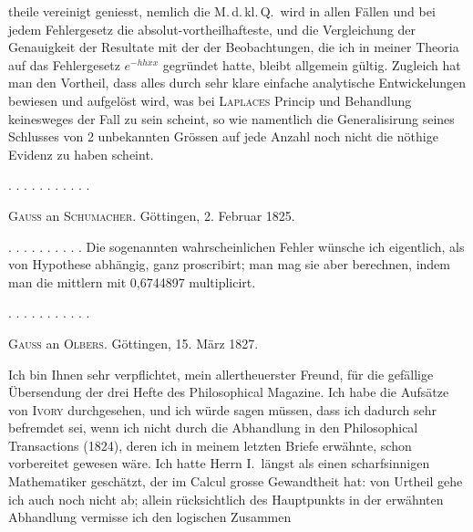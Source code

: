 theile vereinigt geniesst, nemlich die M.\,d.\,kl.\,Q.\ wird in allen Fällen und bei jedem Fehlergesetz die absolut-vortheilhafteste, und die Vergleichung der Genauigkeit der Resultate mit der der Beobachtungen, die ich in meiner Theoria auf das Fehlergesetz $e^{-hhxx}$ gegründet hatte, bleibt allgemein gültig. Zugleich hat man den Vortheil, dass alles durch sehr klare einfache analytische Entwickelungen bewiesen und aufgelöst wird, was bei \textsc{Laplaces} Princip und Behandlung keinesweges der Fall zu sein scheint, so wie namentlich die Generalisirung seines Schlusses von 2 unbekannten Grössen auf jede Anzahl noch nicht die nöthige Evidenz zu haben scheint.

\noindent . . . . . . . . . . .



\begin{center}
\textsc{Gauss} an \textsc{Schumacher}. Göttingen, 2. Februar 1825.
\end{center}

\noindent . . . . . . . . . . Die sogenannten wahrscheinlichen Fehler wünsche ich eigentlich, als von Hypothese abhängig, ganz proscribirt; man mag sie aber berechnen, indem man die mittlern mit 0,6744897 multiplicirt.

\noindent . . . . . . . . . . .



\begin{center}
\textsc{Gauss} an \textsc{Olbers}. Göttingen, 15. März 1827.
\end{center}

\noindent Ich bin Ihnen sehr verpflichtet, mein allertheuerster Freund, für die gefällige Übersendung der drei Hefte des Philosophical Magazine. Ich habe die Aufsätze von \textsc{Ivory} durchgesehen, und ich würde sagen müssen, dass ich dadurch sehr befremdet sei, wenn ich nicht durch die Abhandlung in den Philosophical Transactions (1824), deren ich in meinem letzten Briefe erwähnte, schon vorbereitet gewesen wäre. Ich hatte Herrn I.\ längst als einen scharfsinnigen Mathematiker geschätzt, der im Calcul grosse Gewandtheit hat: von  Urtheil gehe ich auch noch nicht ab; allein rücksichtlich des Hauptpunkts in der erwähnten Abhandlung vermisse ich den logischen Zusammen%
